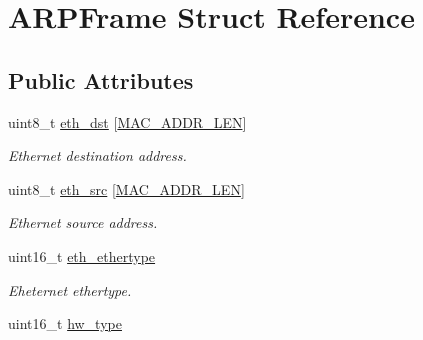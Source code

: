 \hypertarget{structARPFrame}{}\section{A\+R\+P\+Frame Struct Reference}
\label{structARPFrame}
\subsection*{Public Attributes}
\begin{DoxyCompactItemize}
\item 
uint8\+\_\+t \hyperlink{structARPFrame_aa0e0192cbbd37b9bd270ca7bea9b3d59}{eth\+\_\+dst} \mbox{[}\hyperlink{anti__arpspoof_8cpp_a60cf9af36f952be0feb59d1f49d5edff}{M\+A\+C\+\_\+\+A\+D\+D\+R\+\_\+\+L\+EN}\mbox{]}\hypertarget{structARPFrame_aa0e0192cbbd37b9bd270ca7bea9b3d59}{}\label{structARPFrame_aa0e0192cbbd37b9bd270ca7bea9b3d59}

\begin{DoxyCompactList}\small\item\em Ethernet destination address. \end{DoxyCompactList}\item 
uint8\+\_\+t \hyperlink{structARPFrame_af984658833a622e6820f8b43800950b4}{eth\+\_\+src} \mbox{[}\hyperlink{anti__arpspoof_8cpp_a60cf9af36f952be0feb59d1f49d5edff}{M\+A\+C\+\_\+\+A\+D\+D\+R\+\_\+\+L\+EN}\mbox{]}\hypertarget{structARPFrame_af984658833a622e6820f8b43800950b4}{}\label{structARPFrame_af984658833a622e6820f8b43800950b4}

\begin{DoxyCompactList}\small\item\em Ethernet source address. \end{DoxyCompactList}\item 
uint16\+\_\+t \hyperlink{structARPFrame_aea17c3f79375ba331b2cc2d1e07d3793}{eth\+\_\+ethertype}\hypertarget{structARPFrame_aea17c3f79375ba331b2cc2d1e07d3793}{}\label{structARPFrame_aea17c3f79375ba331b2cc2d1e07d3793}

\begin{DoxyCompactList}\small\item\em Eheternet ethertype. \end{DoxyCompactList}\item 
uint16\+\_\+t \hyperlink{structARPFrame_ac90ec200ff4ec2bdaa08932dd9c559ba}{hw\+\_\+type}\hypertarget{structARPFrame_ac90ec200ff4ec2bdaa08932dd9c559ba}{}\label{structARPFrame_ac90ec200ff4ec2bdaa08932dd9c559ba}


\end{DoxyCompactItemize}
